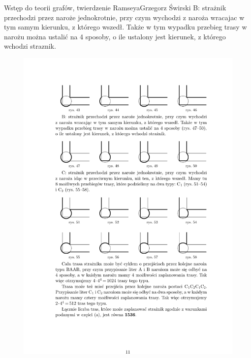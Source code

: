 \begin{referat}{Wstęp do teorii grafów, twierdzenie Ramseya}{Grzegorz Świrski}
B: strażnik przechodzi przez naroże jednokrotnie, przy czym wychodzi
z naroża wracajac w tym samym kierunku, z którego wszedł. Także w tym
wypadku przebieg trasy w narożu można ustalić na 4 sposoby,
o ile ustalony jest kierunek, z którego wchodzi straznik.
\begin{figure}[!h]
  \begin{flushright}
  \includegraphics[scale=1]{./swirski/ex6b.pdf}
  \end{flushright}
\end{figure}


\end{referat}
